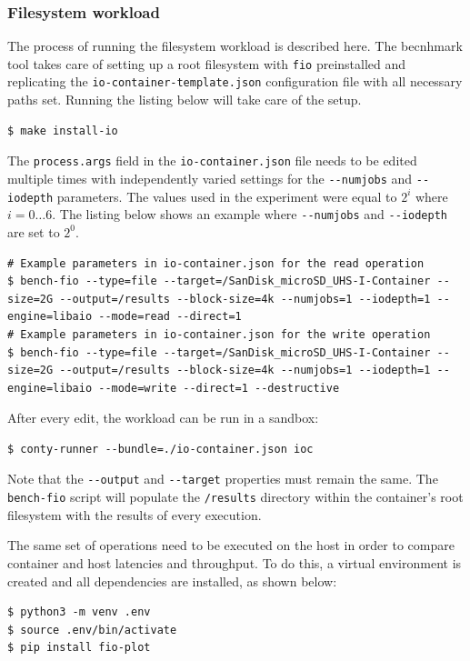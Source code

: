 \subsubsection{Filesystem workload}
The process of running the filesystem workload is described here. The becnhmark tool 
takes care of setting up a root filesystem with \verb|fio| preinstalled and replicating the 
\verb|io-container-template.json| configuration file with all necessary paths set.
Running the listing below will take care of the setup.
\begin{lstlisting}[label={code:implementation/benchmark/io-install}, style=bash, caption={}]
$ make install-io
\end{lstlisting}
The \verb|process.args| field in the \verb|io-container.json| file needs to be edited multiple times 
with independently varied settings for the \verb|--numjobs| and \verb|--iodepth| parameters. 
The values used in the experiment were equal to $2^{i}$ where $i = 0 \hdots 6$.
The listing below shows an example where \verb|--numjobs| and \verb|--iodepth| are set to $2^{0}$.
\begin{lstlisting}[label={code:implementation/benchmark/io-run}, style=bash, caption={}]
# Example parameters in io-container.json for the read operation
$ bench-fio --type=file --target=/SanDisk_microSD_UHS-I-Container --size=2G --output=/results --block-size=4k --numjobs=1 --iodepth=1 --engine=libaio --mode=read --direct=1 
# Example parameters in io-container.json for the write operation
$ bench-fio --type=file --target=/SanDisk_microSD_UHS-I-Container --size=2G --output=/results --block-size=4k --numjobs=1 --iodepth=1 --engine=libaio --mode=write --direct=1 --destructive 
\end{lstlisting}
After every edit, the workload can be run in a sandbox:
\begin{lstlisting}[label={code:implementation/benchmark/io-run-container}, style=bash, caption={}]
$ conty-runner --bundle=./io-container.json ioc
\end{lstlisting}
Note that the \verb|--output| and \verb|--target| properties must remain the same. 
The \verb|bench-fio| script will populate the \verb|/results| directory within the container's 
root filesystem with the results of every execution.

The same set of operations need to be executed on the host in order to compare container and host 
latencies and throughput. To do this, a virtual environment is created and all dependencies 
are installed, as shown below:
\begin{lstlisting}[label={code:implementation/benchmark/io-prep}, style=bash, caption={}]
$ python3 -m venv .env 
$ source .env/bin/activate
$ pip install fio-plot
\end{lstlisting}

